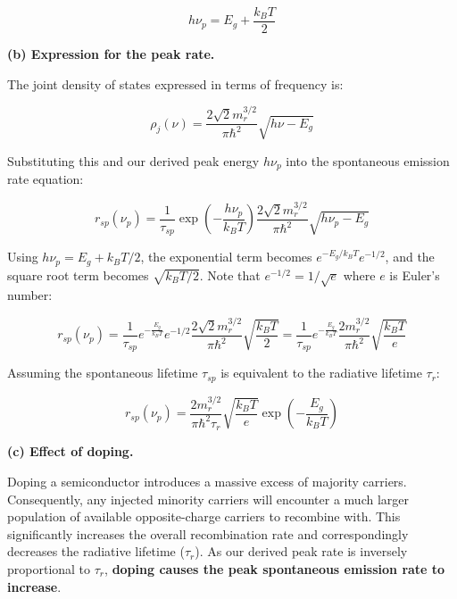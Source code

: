 \begin{equation*}
  \boxed{h\nu_p = E_g + \frac{k_B T}{2}}
\end{equation*}

\textbf{(b) Expression for the peak rate.}

The joint density of states expressed in terms of frequency is:

\begin{equation*}
  \rho_j(\nu) = \frac{2\sqrt{2} m_r^{3/2}}{\pi \hbar^2} \sqrt{h\nu - E_g}
\end{equation*}

Substituting this and our derived peak energy $h\nu_p$ into the spontaneous emission rate equation:

\begin{equation*}
  r_{sp}(\nu_p) = \frac{1}{\tau_{sp}} \exp\left(-\frac{h\nu_p}{k_B T}\right) \frac{2\sqrt{2} m_r^{3/2}}{\pi \hbar^2} \sqrt{h\nu_p - E_g}
\end{equation*}

Using $h\nu_p = E_g + k_B T/2$, the exponential term becomes $e^{-E_g / k_B T} e^{-1/2}$, and the square root term becomes $\sqrt{k_B T/2}$. Note that $e^{-1/2} = 1/\sqrt{e}$ where $e$ is Euler's number:

\begin{equation*}
  r_{sp}(\nu_p) = \frac{1}{\tau_{sp}} e^{-\frac{E_g}{k_B T}} e^{-1/2} \frac{2\sqrt{2} m_r^{3/2}}{\pi \hbar^2} \sqrt{\frac{k_B T}{2}} = \frac{1}{\tau_{sp}} e^{-\frac{E_g}{k_B T}} \frac{2 m_r^{3/2}}{\pi \hbar^2} \sqrt{\frac{k_B T}{e}}
\end{equation*}

Assuming the spontaneous lifetime $\tau_{sp}$ is equivalent to the radiative lifetime $\tau_r$:

\begin{equation*}
  \boxed{r_{sp}(\nu_p) = \frac{2 m_r^{3/2}}{\pi \hbar^2 \tau_r} \sqrt{\frac{k_B T}{e}} \exp\left(-\frac{E_g}{k_B T}\right)}
\end{equation*}

\textbf{(c) Effect of doping.}

Doping a semiconductor introduces a massive excess of majority carriers. Consequently, any injected minority carriers will encounter a much larger population of available opposite-charge carriers to recombine with. This significantly increases the overall recombination rate and correspondingly decreases the radiative lifetime ($\tau_r$). As our derived peak rate is inversely proportional to $\tau_r$, \textbf{doping causes the peak spontaneous emission rate to increase}.

